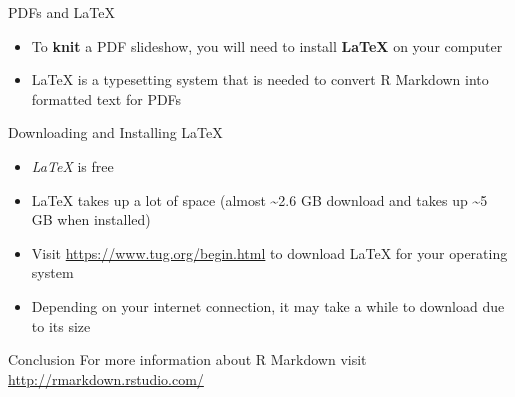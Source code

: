 \documentclass[
  ignorenonframetext,
]{beamer}
\providecommand{\tightlist}{%
  \setlength{\itemsep}{0pt}\setlength{\parskip}{0pt}}
\begin{document}
\begin{frame}{PDFs and LaTeX}
\protect\hypertarget{pdfs-and-latex}{}
\begin{itemize}
\tightlist
\item
  To \textbf{knit} a PDF slideshow, you will need to install
  \textbf{LaTeX} on your computer
\item
  LaTeX is a typesetting system that is needed to convert R Markdown
  into formatted text for PDFs
\end{itemize}

\begin{block}{Downloading and Installing LaTeX}
\protect\hypertarget{downloading-and-installing-latex}{}
\begin{itemize}
\tightlist
\item
  \emph{LaTeX} is free
\item
  LaTeX takes up a lot of space (almost \textasciitilde2.6 GB download
  and takes up \textasciitilde5 GB when installed)
\item
  Visit \url{https://www.tug.org/begin.html} to download LaTeX for your
  operating system
\item
  Depending on your internet connection, it may take a while to download
  due to its size
\end{itemize}
\end{block}
\end{frame}

\begin{frame}{Conclusion}
\protect\hypertarget{conclusion}{}
For more information about R Markdown visit
\url{http://rmarkdown.rstudio.com/}
\end{frame}
\end{document}
